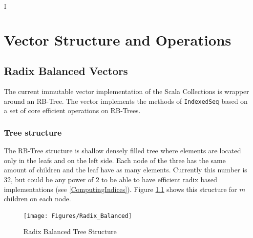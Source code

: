 I%

\chapter{Vector Structure and Operations} %

\label{VectorStructure} %



\section{Radix Balanced Vectors}

The current immutable vector implementation\cite{scalaVector211} of the Scala Collections is wrapper around an RB-Tree. The vector implements the methods of \texttt{IndexedSeq} based on a set of core efficient operations on RB-Trees.


\subsection{Tree structure}
The RB-Tree structure is shallow densely filled tree where elements are located only in the leafs and on the left side. Each node of the three has the same amount of children and the leaf have as many elements. Currently this number is 32, but could be any power of 2 to be able to have efficient radix based implementations (see \ref{ComputingIndices}). Figure \ref{badix_balanced} shows this structure for $m$ children on each node. 

\begin{figure}[h!]
  \centering
  \texttt{[image: Figures/Radix\_Balanced]}
  \caption{Radix Balanced Tree Structure}
   \label{badix_balanced}
\end{figure}

